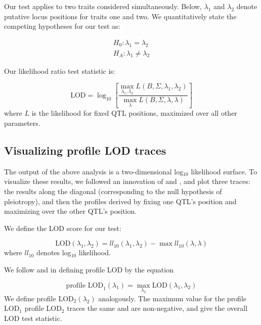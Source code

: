 \documentclass[12pt,twoside, lineno]{gsajnl}
\begin{document}
Our test applies to two traits considered simultaneously. Below,
$\lambda_1$ and $\lambda_2$ denote putative locus positions for traits
one and two. We quantitatively state the competing hypotheses for our
test as:

\begin{eqnarray}
H_0: \lambda_1 = \lambda_2 \nonumber\\
H_A: \lambda_1 \neq \lambda_2
\label{eqn:hypotheses}
\end{eqnarray}

\noindent Our likelihood ratio test statistic is:

\begin{equation}
\text{LOD} = \log_{10} \left[ \frac{\max_{\lambda_1, \lambda_2} L(B, \Sigma, \lambda_1, \lambda_2)}{
    \max_\lambda L(B, \Sigma, \lambda, \lambda)} \right]
\label{eqn:test-statistic}
\end{equation}
where $L$ is the likelihood for fixed QTL positions,
maximized over all other parameters.

\subsection{Visualizing profile LOD traces}

The output of the above analysis is a two-dimensional log$_{10}$ likelihood
surface. To visualize these results, we followed an innovation of \citet{zeng2000genetic} and
\citet{tian2016dissection}, and plot three traces: the results along the
diagonal (corresponding to the null hypothesis of pleiotropy), and
then the profiles derived by fixing one QTL's position
and maximizing over the other QTL's position.

We define the LOD score for our test:

\begin{equation}
\text{LOD}(\lambda_1, \lambda_2) = ll_{10}(\lambda_1, \lambda_2) - \max ll_{10}(\lambda, \lambda)
\label{eq:lodpvl}
\end{equation}
where $ll_{10}$ denotes log$_{10}$ likelihood.

We follow \citet{zeng2000genetic} and \citet{tian2016dissection} in
defining profile LOD by the equation

\begin{equation}
\text{profile LOD}_1(\lambda_1) = \max_{\lambda_2}\text{LOD}(\lambda_1, \lambda_2)
\label{eq:profilelod}
\end{equation}
We define profile LOD$_2(\lambda_2)$ analogously.
The maximum value for the profile LOD$_1$
profile LOD$_2$ traces the same and are non-negative, and give the
overall LOD test statistic.
\end{document}
